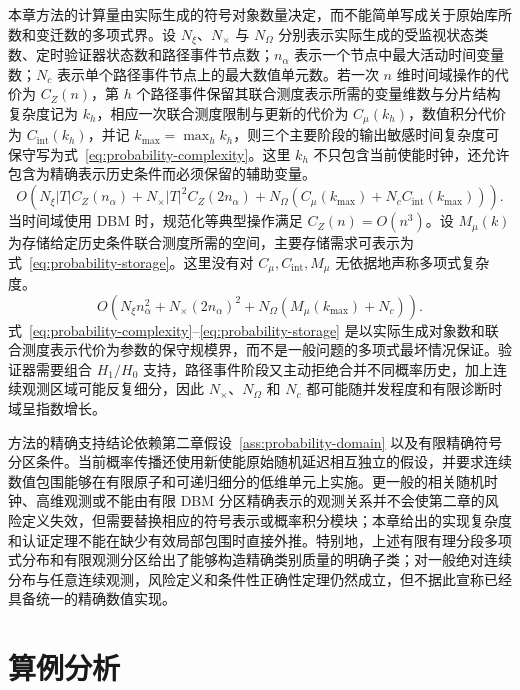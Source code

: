 \documentclass[master,fontset=ubuntu]{shnuthesis}
\theoremstyle{definition}
\begin{document}
本章方法的计算量由实际生成的符号对象数量决定，而不能简单写成关于原始库所数和变迁数的多项式界。设 \(N_\xi\)、\(N_\times\) 与 \(N_\Omega\) 分别表示实际生成的受监视状态类数、定时验证器状态数和路径事件节点数；\(n_\alpha\) 表示一个节点中最大活动时间变量数；\(N_c\) 表示单个路径事件节点上的最大数值单元数。若一次 \(n\) 维时间域操作的代价为 \(C_Z(n)\)，第 \(h\) 个路径事件保留其联合测度表示所需的变量维数与分片结构复杂度记为 \(k_h\)，相应一次联合测度限制与更新的代价为 \(C_\mu(k_h)\)，数值积分代价为 \(C_{\mathrm{int}}(k_h)\)，并记 \(k_{\max}=\max_h k_h\)，则三个主要阶段的输出敏感时间复杂度可保守写为式~\eqref{eq:probability-complexity}。这里 \(k_h\) 不只包含当前使能时钟，还允许包含为精确表示历史条件而必须保留的辅助变量。
\begin{equation}
O\!\left(
N_\xi |T| C_Z(n_\alpha)
+
N_\times |T|^2 C_Z(2n_\alpha)
+
N_\Omega\left(C_\mu(k_{\max})+N_c C_{\mathrm{int}}(k_{\max})\right)
\right).
\label{eq:probability-complexity}
\end{equation}
当时间域使用 DBM 时，规范化等典型操作满足 \(C_Z(n)=O(n^3)\)。设 \(M_\mu(k)\) 为存储给定历史条件联合测度所需的空间，主要存储需求可表示为式~\eqref{eq:probability-storage}。这里没有对 \(C_\mu,C_{\mathrm{int}},M_\mu\) 无依据地声称多项式复杂度。
\begin{equation}
O\!\left(
N_\xi n_\alpha^2
+
N_\times(2n_\alpha)^2
+
N_\Omega\left(M_\mu(k_{\max})+N_c\right)
\right).
\label{eq:probability-storage}
\end{equation}
式~\eqref{eq:probability-complexity}--\eqref{eq:probability-storage} 是以实际生成对象数和联合测度表示代价为参数的保守规模界，而不是一般问题的多项式最坏情况保证。验证器需要组合 \(H_1/H_0\) 支持，路径事件阶段又主动拒绝合并不同概率历史，加上连续观测区域可能反复细分，因此 \(N_\times\)、\(N_\Omega\) 和 \(N_c\) 都可能随并发程度和有限诊断时域呈指数增长。

方法的精确支持结论依赖第二章假设~\ref{ass:probability-domain} 以及有限精确符号分区条件。当前概率传播还使用新使能原始随机延迟相互独立的假设，并要求连续数值包围能够在有限原子和可递归细分的低维单元上实施。更一般的相关随机时钟、高维观测或不能由有限 DBM 分区精确表示的观测关系并不会使第二章的风险定义失效，但需要替换相应的符号表示或概率积分模块；本章给出的实现复杂度和认证定理不能在缺少有效局部包围时直接外推。特别地，上述有限有理分段多项式分布和有限观测分区给出了能够构造精确类别质量的明确子类；对一般绝对连续分布与任意连续观测，风险定义和条件性正确性定理仍然成立，但不据此宣称已经具备统一的精确数值实现。

\section{算例分析}
\end{document}
